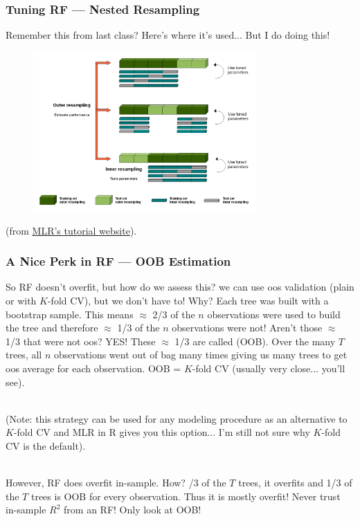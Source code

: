 \documentclass[handout]{beamer}
\begin{document}
\begin{frame}\frametitle{Tuning RF --- Nested Resampling}

Remember this from last class? Here's where it's used... But I do  doing this!

\begin{figure}
\centering
\includegraphics[width=3.36in]{nested_resampling_for_tuning.png}
\end{figure}

(from \href{https://mlr-org.github.io/mlr-tutorial/devel/html/nested_resampling/index.html}{MLR's tutorial website}).
\end{frame}

\begin{frame}\frametitle{A Nice Perk in RF --- OOB Estimation}

So RF doesn't overfit, but how do we assess this? \pause we can use oos validation (plain or with $K$-fold CV), but we don't have to! Why? \pause Each tree was built with a bootstrap sample. This means $\approx$ 2/3 of the $n$ observations were used to build the tree and therefore $\approx$ 1/3 of the $n$ observations were not! Aren't those $\approx$ 1/3 that were not oos? \pause YES! \pause These $\approx$ 1/3 are called  (OOB). Over the many $T$ trees, all $n$ observations went out of bag many times giving us many trees to get oos average for each observation. OOB = $K$-fold CV (usually very close... you'll see).\\~\\ \pause


\tiny
(Note: this strategy can be used for any modeling procedure as an alternative to $K$-fold CV and MLR in R gives you this option... I'm still not sure why $K$-fold CV is the default). \\~\\ \pause
\normalsize

However, RF does overfit in-sample. How? /3 of the $T$ trees, it overfits and 1/3 of the $T$ trees is OOB for every observation. Thus it is mostly overfit! Never trust in-sample $R^2$ from an RF! Only look at OOB!
\end{frame}
\end{document}
